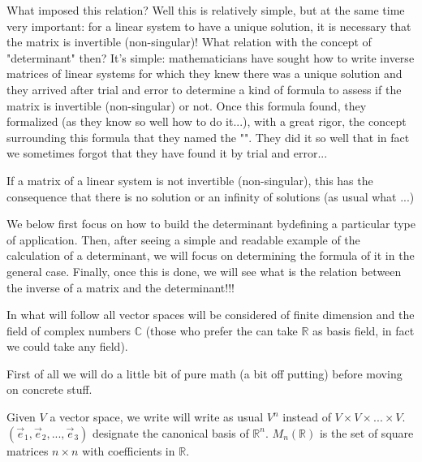 	What imposed this relation? Well this is relatively simple, but at the same time very important: for a linear system to have a unique solution, it is necessary that the matrix is invertible (non-singular)! What relation with the  concept of "determinant" then? It's simple: mathematicians have sought how to write inverse matrices of linear systems for which they knew there was a unique solution and they arrived after trial and error to determine a kind of formula to assess if the matrix is invertible (non-singular) or not. Once this formula found, they formalized (as they know so well how to do it...), with a great rigor, the concept surrounding this formula that they named the "". They did it so well that in fact we sometimes forgot that they have found it by trial and error...
	\begin{tcolorbox}[title=Remark,colframe=black,arc=10pt]
	If a matrix of a linear system is not invertible (non-singular), this has the consequence that there is no solution or an infinity of solutions (as usual what ...)
	\end{tcolorbox}
	We below first focus on how to build the determinant bydefining a particular type of application. Then, after seeing a simple and readable example of the calculation of a determinant, we will focus on determining the formula of it in the general case. Finally, once this is done, we will see what is the relation between the inverse of a matrix and the determinant!!!
	
	In what will follow all vector spaces will be considered of finite dimension and the field of complex numbers $\mathbb{C}$ (those who prefer the can take $\mathbb{R}$ as basis field, in fact we could take any field).
	
	First of all we will do a little bit of pure math (a bit off putting) before moving on  concrete stuff.
	
	Given $V$ a vector space, we write will write as usual $V^n$ instead of $V\times V\times... \times V$. $(\vec{e}_1,\vec{e}_2,...,\vec{e}_3)$ designate the canonical basis of $\mathbb{R}^n$. $M_n(\mathbb{R})$ is the set of square matrices $n\times n$ with coefficients in $\mathbb{R}$.
	

